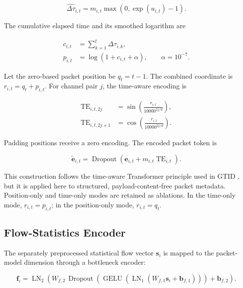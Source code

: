 \documentclass[11pt,fleqn]{report}
\begin{document}
\begin{equation}
    \widehat{\Delta\tau}_{i,t}
    =m_{i,t}\max\left(0,\exp(u_{i,t})-1\right).
    \label{eq:reconstructed_iat}
\end{equation}

The cumulative elapsed time and its smoothed logarithm are

\begin{align}
    c_{i,t} &= \sum_{k=1}^{t}\widehat{\Delta\tau}_{i,k},\\
    p_{i,t} &= \log\left(1+c_{i,t}+\alpha\right),
    \qquad \alpha=10^{-7}.
    \label{eq:cumulative_time_feature}
\end{align}

Let the zero-based packet position be $q_t=t-1$. The combined coordinate is $r_{i,t}=q_t+p_{i,t}$. For channel pair $j$, the time-aware encoding is

\begin{align}
    \operatorname{TE}_{i,t,2j}
    &=\sin\left(
        \frac{r_{i,t}}{10000^{2j/d}}
      \right),\\
    \operatorname{TE}_{i,t,2j+1}
    &=\cos\left(
        \frac{r_{i,t}}{10000^{2j/d}}
      \right).
    \label{eq:time_aware_sinusoid}
\end{align}

Padding positions receive a zero encoding. The encoded packet token is

\begin{equation}
    \widetilde{\mathbf{e}}_{i,t}
    =\operatorname{Dropout}
    \left(
        \mathbf{e}_{i,t}+m_{i,t}\operatorname{TE}_{i,t}
    \right).
    \label{eq:time_encoded_packet}
\end{equation}

This construction follows the time-aware Transformer principle used in GTID \cite{Han2023GTID}, but it is applied here to structured, payload-content-free packet metadata. Position-only and time-only modes are retained as ablations. In the time-only mode, $r_{i,t}=p_{i,t}$; in the position-only mode, $r_{i,t}=q_t$.

\subsection{Flow-Statistics Encoder}
\label{subsubsec:flow_encoder}

The separately preprocessed statistical flow vector $\mathbf{s}_i$ is mapped to the packet-model dimension through a bottleneck encoder:

\begin{equation}
    \mathbf{f}_i
    =\operatorname{LN}_2
    \left(
        W_{f,2}\,
        \operatorname{Dropout}
        \left(
            \operatorname{GELU}
            \left(
                \operatorname{LN}_1(W_{f,1}\mathbf{s}_i+\mathbf{b}_{f,1})
            \right)
        \right)
        +\mathbf{b}_{f,2}
    \right).
    \label{eq:flow_feature_encoder}
\end{equation}
\end{document}
